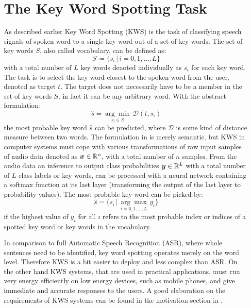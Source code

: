 
\section{The Key Word Spotting Task}\label{sec:intro_kws}
\thesisStateRevised
As described earlier Key Word Spotting (KWS) is the task of classifying speech signals of spoken word to a single key word out of a set of key words.
The set of key words $S$, also called vocabulary, can be defined as:
\begin{equation}\label{eq:intro_kws_dict}
	S \coloneqq \{s_i \, | \, i = 0, 1, \dots, L\}
\end{equation}
with a total number of $L$ key words denoted individually as $s_i$ for each key word.
The task is to select the key word closest to the spoken word from the user, denoted as target $t$.
The target does not necessarily have to be a member in the set of key words $S$, in fact it can be any arbitrary word.
With the abstract formulation:
\begin{equation}\label{eq:intro_kws_task}
	\hat{s} = \underset{s_i \in S}{\arg \min} \, \mathcal{D}(t, s_i)
\end{equation}
the most probable key word $\hat{s}$ can be predicted, where $\mathcal{D}$ is some kind of distance measure between two words.
The formulation in  is merely semantic, but KWS in computer systems must cope with various transformations of raw input samples of audio data denoted as $\bm{x} \in \mathbb{R}^n$, with a total number of $n$ samples.
From the audio data an inference to output class probabilities $\bm{y} \in \mathbb{R}^L$ with a total number of $L$ class labels or key words, can be processed with a neural network containing a softmax function at its last layer (transforming the output of the last layer to probability values).
The most probable key word can be picked by:
\begin{equation}\label{eq:intro_kws_class}
	\hat{s} = \{s_i \, | \, \underset{i = 0, 1, \dots, L}{\arg \max} \, y_i\}
\end{equation}
if the highest value of $y_i$ for all $i$ refers to the most probable index or indices of a spotted key word or key words in the vocabulary.

In comparison to full Automatic Speech Recognition (ASR), where whole sentences need to be identified, key word spotting operates merely on the word level.
Therefore KWS is a bit easier to deploy and less complex than ASR.
On the other hand KWS systems, that are used in practical applications, must run very energy efficiently on low energy devices, such as mobile phones, and give immediate and accurate responses to the users. 
A good elaboration on the requirements of KWS systems can be found in the motivation section in \cite{Warden2018}.

